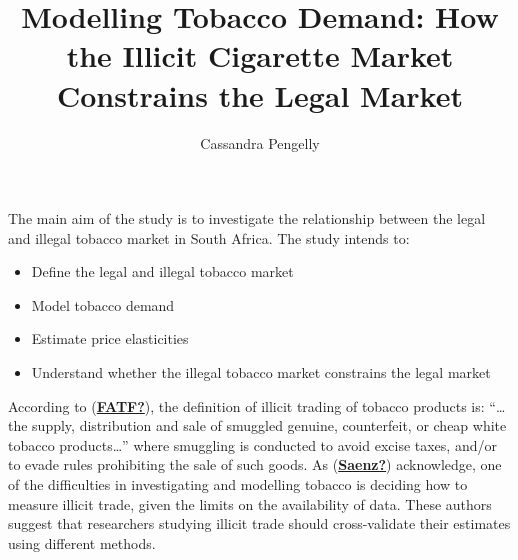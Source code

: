\documentclass[11pt,preprint, authoryear]{elsarticle}
\numberwithin{equation}{section}
\numberwithin{figure}{section}
\numberwithin{table}{section}
\begin{document}
\begin{frontmatter}  %

\title{Modelling Tobacco Demand: How the Illicit Cigarette Market
Constrains the Legal Market}





\author[Add1]{Cassandra Pengelly}
\ead{}





\address[Add1]{Stellenbosch University}



\vspace{1cm}





\vspace{0.5cm}

\end{frontmatter}



\pagestyle{fancy}
\chead{}
\lfoot{}
\rfoot{}
\lhead{}
\cfoot{}


\headsep 35pt %




The main aim of the study is to investigate the relationship between the
legal and illegal tobacco market in South Africa. The study intends to:

\begin{itemize}
\item
  Define the legal and illegal tobacco market
\item
  Model tobacco demand
\item
  Estimate price elasticities
\item
  Understand whether the illegal tobacco market constrains the legal
  market
\end{itemize}

According to (\protect\hyperlink{ref-FATF}{\textbf{FATF?}}), the
definition of illicit trading of tobacco products is: ``\ldots the
supply, distribution and sale of smuggled genuine, counterfeit, or cheap
white tobacco products\ldots{}'' where smuggling is conducted to avoid
excise taxes, and/or to evade rules prohibiting the sale of such goods.
As (\protect\hyperlink{ref-Saenz}{\textbf{Saenz?}}) acknowledge, one of
the difficulties in investigating and modelling tobacco is deciding how
to measure illicit trade, given the limits on the availability of data.
These authors suggest that researchers studying illicit trade should
cross-validate their estimates using different methods.
\end{document}
